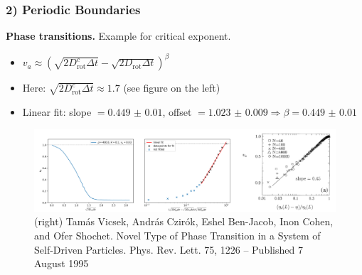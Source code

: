 \begin{frame}
	\frametitle{2) Periodic Boundaries}
	\textbf{Phase transitions.} Example for critical exponent.
	\begin{itemize}
	    \item $v_a \approx \left(\sqrt{2D_{\text{rot}}^c\Delta t} - \sqrt{2D_{\text{rot}}\Delta t}\right)^{\beta}$
	    \item Here: $\sqrt{2D_{\text{rot}}^c\Delta t} \approx 1.7$ (see figure on the left)
	    \item Linear fit: slope $=\num{0.449(10)}$, offset $=\num{1.023(9)} \Rightarrow \beta = \num{0.449(10)}$
	\end{itemize}
	\begin{figure}[H]
  		\includegraphics[width=\textwidth]{images/chapter2/pbc_critical_exponents.png} 
  		\caption*{(right) Tamás Vicsek, András Czirók, Eshel Ben-Jacob, Inon Cohen, and Ofer Shochet. Novel Type of Phase Transition in a System of Self-Driven Particles. Phys. Rev. Lett. 75, 1226 – Published 7 August 1995}
	\end{figure}
\end{frame}